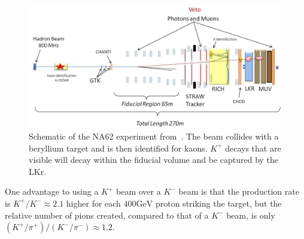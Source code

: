 \begin{figure}[h]
    \centering
    \includegraphics[width=\textwidth]{Figures/experiments/na62_schematic}
    \caption{Schematic of the NA62 experiment from~\cite{Martellotti:2015kna}. The beam collides with a beryllium target and is then identified for kaons. $K^+$ decays that are visible will decay within the fiducial volume and be captured by the LKr.}
    \label{fig:na62_experiment}
\end{figure}

One advantage to using a $K^+$ beam over a $K^-$ beam is that the production rate is $K^+ / K^- \approx 2.1$ higher for each $400\textrm{GeV}$ proton striking the target, but the relative number of pions created, compared to that of a $K^-$ beam, is only $(K^+ / \pi^+) / (K^- / \pi^-) \approx 1.2$.
